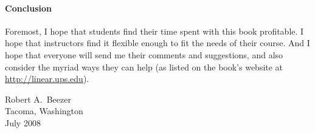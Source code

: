 \paragraph{Conclusion}
%
Foremost, I hope that students find their time spent with this book profitable.  I hope that instructors find it flexible enough to fit the needs of their course.  And I hope that everyone will send me their comments and suggestions, and also consider the myriad ways they can help (as listed on the book's website at \url{http://linear.ups.edu}).
%
\begin{flushright}
Robert A.\ Beezer\\
Tacoma, Washington\\
July 2008
\end{flushright}
